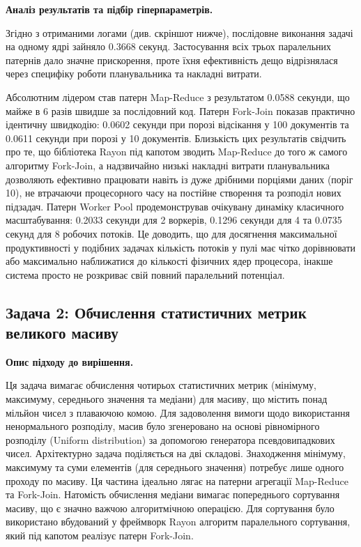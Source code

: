 \documentclass[14pt, a4paper]{extreport}
\begin{document}
	\textbf{Аналіз результатів та підбір гіперпараметрів.}
	
	Згідно з отриманими логами (див. скріншот нижче), послідовне виконання задачі на одному ядрі зайняло 0.3668 секунд. Застосування всіх трьох паралельних патернів дало значне прискорення, проте їхня ефективність дещо відрізнялася через специфіку роботи планувальника та накладні витрати.
	
	
	Абсолютним лідером став патерн Map-Reduce з результатом 0.0588 секунди, що майже в 6 разів швидше за послідовний код. Патерн Fork-Join показав практично ідентичну швидкодію: 0.0602 секунди при порозі відсікання у 100 документів та 0.0611 секунди при порозі у 10 документів. Близькість цих результатів свідчить про те, що бібліотека Rayon під капотом зводить Map-Reduce до того ж самого алгоритму Fork-Join, а надзвичайно низькі накладні витрати планувальника дозволяють ефективно працювати навіть із дуже дрібними порціями даних (поріг 10), не втрачаючи процесорного часу на постійне створення та розподіл нових підзадач. Патерн Worker Pool продемонстрував очікувану динаміку класичного масштабування: 0.2033 секунди для 2 воркерів, 0.1296 секунди для 4 та 0.0735 секунд для 8 робочих потоків. Це доводить, що для досягнення максимальної продуктивності у подібних задачах кількість потоків у пулі має чітко дорівнювати або максимально наближатися до кількості фізичних ядер процесора, інакше система просто не розкриває свій повний паралельний потенціал.
	
	
	\subsection{Задача 2: Обчислення статистичних метрик великого масиву}
	
	\textbf{Опис підходу до вирішення.}
	
	Ця задача вимагає обчислення чотирьох статистичних метрик (мінімуму, максимуму, середнього значення та медіани) для масиву, що містить понад мільйон чисел з плаваючою комою. Для задоволення вимоги щодо використання ненормального розподілу, масив було згенеровано на основі рівномірного розподілу (Uniform distribution) за допомогою генератора псевдовипадкових чисел. Архітектурно задача поділяється на дві складові. Знаходження мінімуму, максимуму та суми елементів (для середнього значення) потребує лише одного проходу по масиву. Ця частина ідеально лягає на патерни агрегації Map-Reduce та Fork-Join. Натомість обчислення медіани вимагає попереднього сортування масиву, що є значно важчою алгоритмічною операцією. Для сортування було використано вбудований у фреймворк Rayon алгоритм паралельного сортування, який під капотом реалізує патерн Fork-Join.
	
\end{document}
